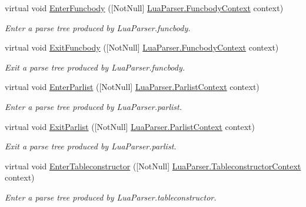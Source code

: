 \begin{DoxyCompactItemize}
virtual void \mbox{\hyperlink{classzlua_1_1_lua_base_listener_a3e3c9ea85f3429d18fb56ed19476c5d3}{Enter\+Funcbody}} (\mbox{[}Not\+Null\mbox{]} \mbox{\hyperlink{classzlua_1_1_lua_parser_1_1_funcbody_context}{Lua\+Parser.\+Funcbody\+Context}} context)
\begin{DoxyCompactList}\small\item\em Enter a parse tree produced by Lua\+Parser.\+funcbody. \end{DoxyCompactList}\item 
virtual void \mbox{\hyperlink{classzlua_1_1_lua_base_listener_add219d0a2aad2403b075bb1eb2550383}{Exit\+Funcbody}} (\mbox{[}Not\+Null\mbox{]} \mbox{\hyperlink{classzlua_1_1_lua_parser_1_1_funcbody_context}{Lua\+Parser.\+Funcbody\+Context}} context)
\begin{DoxyCompactList}\small\item\em Exit a parse tree produced by Lua\+Parser.\+funcbody. \end{DoxyCompactList}\item 
virtual void \mbox{\hyperlink{classzlua_1_1_lua_base_listener_a731d7b4d2ae1ef89c04c01da08cddbc7}{Enter\+Parlist}} (\mbox{[}Not\+Null\mbox{]} \mbox{\hyperlink{classzlua_1_1_lua_parser_1_1_parlist_context}{Lua\+Parser.\+Parlist\+Context}} context)
\begin{DoxyCompactList}\small\item\em Enter a parse tree produced by Lua\+Parser.\+parlist. \end{DoxyCompactList}\item 
virtual void \mbox{\hyperlink{classzlua_1_1_lua_base_listener_af7c71a424a8f8682ecd95c95cff6e64b}{Exit\+Parlist}} (\mbox{[}Not\+Null\mbox{]} \mbox{\hyperlink{classzlua_1_1_lua_parser_1_1_parlist_context}{Lua\+Parser.\+Parlist\+Context}} context)
\begin{DoxyCompactList}\small\item\em Exit a parse tree produced by Lua\+Parser.\+parlist. \end{DoxyCompactList}\item 
virtual void \mbox{\hyperlink{classzlua_1_1_lua_base_listener_a1aff2c410cda086c68c4dd53123c8082}{Enter\+Tableconstructor}} (\mbox{[}Not\+Null\mbox{]} \mbox{\hyperlink{classzlua_1_1_lua_parser_1_1_tableconstructor_context}{Lua\+Parser.\+Tableconstructor\+Context}} context)
\begin{DoxyCompactList}\small\item\em Enter a parse tree produced by Lua\+Parser.\+tableconstructor. \end{DoxyCompactList}\item 

\end{DoxyCompactItemize}
